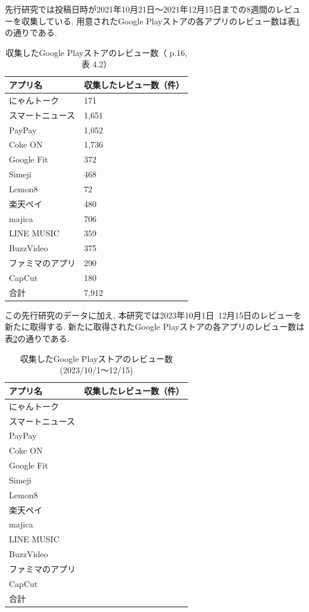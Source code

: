 先行研究では投稿日時が2021年10月21日〜2021年12月15日までの8週間のレビューを収集している. 用意されたGoogle Playストアの各アプリのレビュー数は表\ref{tb:rawreviewnum}の通りである. 
\begin{table}[htbp]
  \caption{収集したGoogle Playストアのレビュー数（\cite{kawatsura} p.16, 表 4.2）}
  \label{tb:rawreviewnum}
  \begin{center}
  \begin{tabular}{l|l}
    \hline
    アプリ名&収集したレビュー数（件）\\\hline\hline
    にゃんトーク&171\\\hline
    スマートニュース&1,651\\\hline
    PayPay&1,052\\\hline
    Coke ON&1,736\\\hline
    Google Fit&372\\\hline
    Simeji&468\\\hline
    Lemon8&72\\\hline
    楽天ペイ&480\\\hline
    majica&706\\\hline
    LINE MUSIC&359\\\hline
    BuzzVideo&375\\\hline
    ファミマのアプリ&290\\\hline
    CapCut&180\\\hline\hline
    合計&7,912
  \end{tabular}\end{center}
\end{table}
この先行研究のデータに加え, 本研究では2023年10月1日~12月15日のレビューを新たに取得する. 新たに取得されたGoogle Playストアの各アプリのレビュー数は表\ref{tb:rawreviewnum2023}の通りである. 
\begin{table}[htbp]
  \caption{収集したGoogle Playストアのレビュー数(2023/10/1〜12/15)}
  \label{tb:rawreviewnum2023}
  \begin{center}
  \begin{tabular}{l|l}
    \hline
    アプリ名&収集したレビュー数（件）\\\hline\hline
    にゃんトーク&\\\hline
    スマートニュース&\\\hline
    PayPay&\\\hline
    Coke ON&\\\hline
    Google Fit&\\\hline
    Simeji&\\\hline
    Lemon8&\\\hline
    楽天ペイ&\\\hline
    majica&\\\hline
    LINE MUSIC&\\\hline
    BuzzVideo&\\\hline
    ファミマのアプリ&\\\hline
    CapCut&\\\hline\hline
    合計&
  \end{tabular}\end{center}
\end{table}

